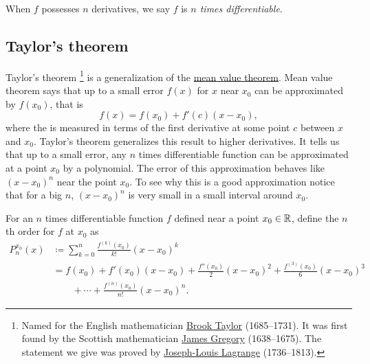 When $f$ possesses $n$ derivatives, we say $f$ is
\emph{$n$ times differentiable}.

\subsection{Taylor's theorem}

Taylor's theorem%
\footnote{Named for the English mathematician
\href{https://en.wikipedia.org/wiki/Brook_Taylor}{Brook Taylor}
(1685--1731).
It was first found by
the Scottish mathematician
\href{https://en.wikipedia.org/wiki/James_Gregory_(mathematician)}{James Gregory}
(1638--1675).  The statement we give
was proved by
\href{https://en.wikipedia.org/wiki/Lagrange}{Joseph-Louis Lagrange}
(1736--1813).}
is a generalization of the \hyperref[thm:mvt]{mean value theorem}.
Mean value theorem says that up to a small error $f(x)$ for $x$ near $x_0$ can be
approximated by $f(x_0)$, that is
\begin{equation*}
f(x) = f(x_0) + f'(c)(x-x_0),
\end{equation*}
where the  is measured in terms of the first derivative
at some point $c$ between $x$ and $x_0$.
Taylor's theorem generalizes this result to higher derivatives.
It tells us that up to a small error, any $n$
times differentiable function can be approximated at a point $x_0$
by a polynomial.  The
error of this approximation behaves like ${(x-x_0)}^{n}$ near the point $x_0$.
To see why this is a good approximation notice that for a big $n$, 
${(x-x_0)}^n$ is very small in a small interval around $x_0$.

\begin{defn}
For an $n$ times differentiable function $f$ defined near a point $x_0 \in {\mathbb{R}}$, define the
$n$th order \emph{}%
for $f$ at $x_0$ as
\begin{equation*}
\begin{split}
P_n^{x_0}(x)
& \coloneqq
\sum_{k=0}^n
\frac{f^{(k)}(x_0)}{k!}{(x-x_0)}^k
\\
& =
f(x_0)
+ f'(x_0)(x-x_0)
+ \frac{f''(x_0)}{2}{(x-x_0)}^2
+ \frac{f^{(3)}(x_0)}{6}{(x-x_0)}^3
\\
& \qquad
+ \cdots
+ \frac{f^{(n)}(x_0)}{n!}{(x-x_0)}^n .
\end{split}
\end{equation*}
\end{defn}

